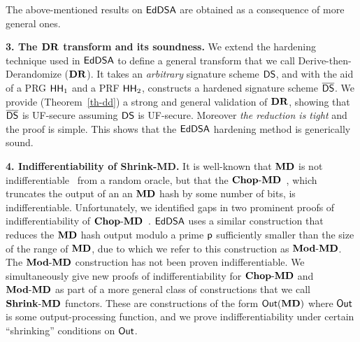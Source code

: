 \begin{sloppypar}
 The above-mentioned results on $\mathsf{EdDSA}$ are obtained as a consequence of more general ones.
\end{sloppypar}
\smallskip
\textbf{3. The $\mathbf{DR}$ transform and its soundness.}
We extend the hardening technique used in $\mathsf{EdDSA}$ to define a general transform that we call Derive-then-Derandomize ($\mathbf{DR}$). It takes an \textit{arbitrary} signature scheme $\mathsf{DS}$, and with the aid of a PRG $\mathsf{HH}_1$ and a PRF $\mathsf{HH}_2$, constructs a hardened signature scheme $\overline{\mathsf{DS}}$. We provide (Theorem~\ref{th-dd}) a strong and general validation of $\mathbf{DR}$, showing that $\overline{\mathsf{DS}}$ is UF-secure assuming $\mathsf{DS}$ is UF-secure. Moreover \textit{the reduction is tight} and the proof is simple. This shows that the $\mathsf{EdDSA}$ hardening method is generically sound.

\smallskip
\textbf{4. Indifferentiability of Shrink-MD.} It is well-known that $\mathbf{MD}$ is not indifferentiable~\cite{TCC:MauRenHol04} from a random oracle, but that
the $\mathbf{Chop\mbox{-}MD}$~\cite{C:CDMP05}, which truncates the output of an an $\mathbf{MD}$ hash by some number of bits, is indifferentiable.
Unfortunately, we identified gaps in two prominent proofs of indifferentiability of $\mathbf{Chop\mbox{-}MD}$~\cite{C:CDMP05,hfrobook}.
$\mathsf{EdDSA}$ uses a similar construction that reduces the $\mathbf{MD}$ hash output modulo a prime $\mathsf{p}$ sufficiently smaller than the size of the range of $\mathbf{MD}$, due to which we refer to this construction as $\mathbf{Mod\mbox{-}MD}$.
The $\mathbf{Mod\mbox{-}MD}$ construction has not been proven indifferentiable.
We simultaneously give new proofs of indifferentiability for $\mathbf{Chop\mbox{-}MD}$ and $\mathbf{Mod\mbox{-}MD}$ as part of a more general class of constructions that we call $\mathbf{Shrink\mbox{-}MD}$ functors.
These are constructions of the form $\mathsf{Out}(\mathbf{MD})$ where $\mathsf{Out}$ is some output-processing function, and we prove indifferentiability under certain ``shrinking'' conditions on $\mathsf{Out}$.
  


